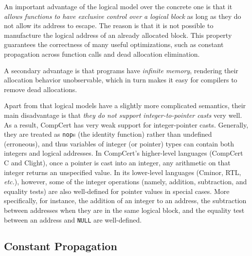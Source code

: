 An important advantage of the logical model over the concrete one is that 
it \emph{allows functions to have exclusive control over a logical block} as 
long as they do not allow its address to escape. The reason is that it
is not possible to manufacture the logical address of an already allocated block.  
This property guarantees the correctness of many useful optimizations, 
such as constant propagation across function calls and dead allocation
elimination.

A secondary advantage is that programs have \emph{infinite memory}, rendering
their allocation behavior unobservable, which in turn makes it easy for
compilers to remove dead allocations.


Apart from that logical models have a slightly more complicated
semantics, their main disadvantage is that \emph{they do not support
  integer-to-pointer casts} very well.
As a result,
CompCert has very weak support for integer-pointer casts.  Generally,
they are treated as \texttt{nop}s (\ie the identity function) rather
than undefined (\ie erroneous), and thus variables of integer (or
pointer) types can contain both integers and logical addresses.  In
CompCert's higher-level languages (CompCert C and Clight), once a
pointer is cast into an integer, any arithmetic on that integer
returns an unspecified value.  In its lower-level languages (Cminor,
RTL, \emph{etc.}), however, some of the integer operations (namely,
addition, subtraction, and equality tests) are also well-defined for
pointer values in special cases.  More specifically, for instance,
the addition of an integer to an address, the
subtraction between addresses when they are in the same logical block,
and the equality test between an address and \texttt{NULL} are well-defined.



\subsection{Constant Propagation}
\label{sec:background:constprop}

